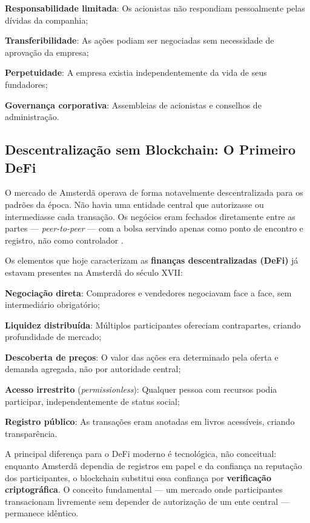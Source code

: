 \begin{alineas}
    \item \textbf{Responsabilidade limitada}: Os acionistas não respondiam pessoalmente pelas dívidas da companhia;
    \item \textbf{Transferibilidade}: As ações podiam ser negociadas sem necessidade de aprovação da empresa;
    \item \textbf{Perpetuidade}: A empresa existia independentemente da vida de seus fundadores;
    \item \textbf{Governança corporativa}: Assembleias de acionistas e conselhos de administração.
\end{alineas}

\subsection{Descentralização sem Blockchain: O Primeiro DeFi}

O mercado de Amsterdã operava de forma notavelmente descentralizada para os padrões da época. Não havia uma entidade central que autorizasse ou intermediasse cada transação. Os negócios eram fechados diretamente entre as partes --- \textit{peer-to-peer} --- com a bolsa servindo apenas como ponto de encontro e registro, não como controlador \cite{gelderblom2013}.

Os elementos que hoje caracterizam as \textbf{finanças descentralizadas (DeFi)} já estavam presentes na Amsterdã do século XVII:

\begin{alineas}
    \item \textbf{Negociação direta}: Compradores e vendedores negociavam face a face, sem intermediário obrigatório;
    \item \textbf{Liquidez distribuída}: Múltiplos participantes ofereciam contrapartes, criando profundidade de mercado;
    \item \textbf{Descoberta de preços}: O valor das ações era determinado pela oferta e demanda agregada, não por autoridade central;
    \item \textbf{Acesso irrestrito} (\textit{permissionless}): Qualquer pessoa com recursos podia participar, independentemente de status social;
    \item \textbf{Registro público}: As transações eram anotadas em livros acessíveis, criando transparência.
\end{alineas}

A principal diferença para o DeFi moderno é tecnológica, não conceitual: enquanto Amsterdã dependia de registros em papel e da confiança na reputação dos participantes, o blockchain substitui essa confiança por \textbf{verificação criptográfica}. O conceito fundamental --- um mercado onde participantes transacionam livremente sem depender de autorização de um ente central --- permanece idêntico.


